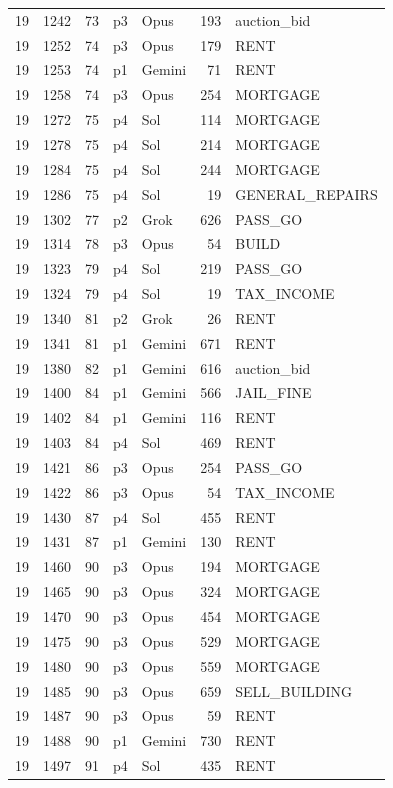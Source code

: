\begin{longtable}{r r r l l r L{2.2in}}
19 & 1242 & 73 & p3 & Opus & 193 & auction\_bid \\
19 & 1252 & 74 & p3 & Opus & 179 & RENT \\
19 & 1253 & 74 & p1 & Gemini & 71 & RENT \\
19 & 1258 & 74 & p3 & Opus & 254 & MORTGAGE \\
19 & 1272 & 75 & p4 & Sol & 114 & MORTGAGE \\
19 & 1278 & 75 & p4 & Sol & 214 & MORTGAGE \\
19 & 1284 & 75 & p4 & Sol & 244 & MORTGAGE \\
19 & 1286 & 75 & p4 & Sol & 19 & GENERAL\_REPAIRS \\
19 & 1302 & 77 & p2 & Grok & 626 & PASS\_GO \\
19 & 1314 & 78 & p3 & Opus & 54 & BUILD \\
19 & 1323 & 79 & p4 & Sol & 219 & PASS\_GO \\
19 & 1324 & 79 & p4 & Sol & 19 & TAX\_INCOME \\
19 & 1340 & 81 & p2 & Grok & 26 & RENT \\
19 & 1341 & 81 & p1 & Gemini & 671 & RENT \\
19 & 1380 & 82 & p1 & Gemini & 616 & auction\_bid \\
19 & 1400 & 84 & p1 & Gemini & 566 & JAIL\_FINE \\
19 & 1402 & 84 & p1 & Gemini & 116 & RENT \\
19 & 1403 & 84 & p4 & Sol & 469 & RENT \\
19 & 1421 & 86 & p3 & Opus & 254 & PASS\_GO \\
19 & 1422 & 86 & p3 & Opus & 54 & TAX\_INCOME \\
19 & 1430 & 87 & p4 & Sol & 455 & RENT \\
19 & 1431 & 87 & p1 & Gemini & 130 & RENT \\
19 & 1460 & 90 & p3 & Opus & 194 & MORTGAGE \\
19 & 1465 & 90 & p3 & Opus & 324 & MORTGAGE \\
19 & 1470 & 90 & p3 & Opus & 454 & MORTGAGE \\
19 & 1475 & 90 & p3 & Opus & 529 & MORTGAGE \\
19 & 1480 & 90 & p3 & Opus & 559 & MORTGAGE \\
19 & 1485 & 90 & p3 & Opus & 659 & SELL\_BUILDING \\
19 & 1487 & 90 & p3 & Opus & 59 & RENT \\
19 & 1488 & 90 & p1 & Gemini & 730 & RENT \\
19 & 1497 & 91 & p4 & Sol & 435 & RENT \\

\end{longtable}
